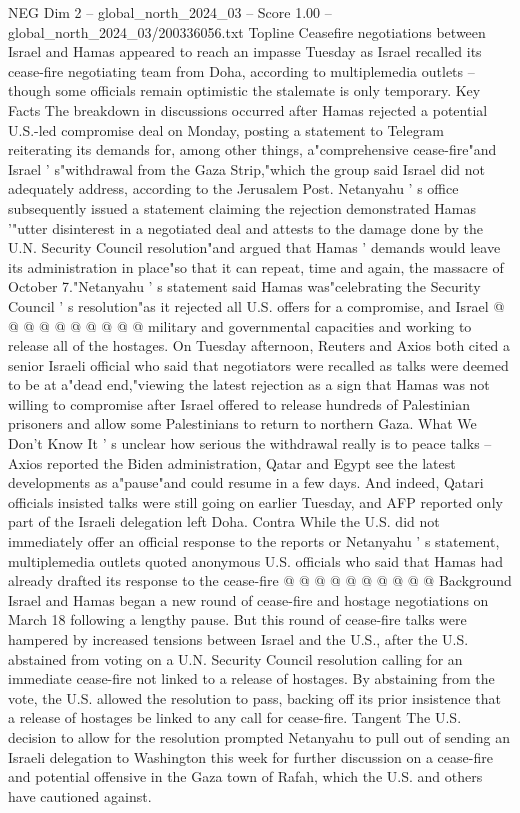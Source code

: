\begin{textsample}{NEG Dim 2 – global\_north\_2024\_03 – Score 1.00 – global\_north\_2024\_03/200336056.txt}  \label{ex:f2_neg_083}
Topline Ceasefire negotiations between Israel and Hamas appeared to reach an impasse Tuesday as Israel recalled its cease-fire negotiating team from Doha, according to multiplemedia outlets -- though some officials remain optimistic the stalemate is only temporary.
Key Facts The breakdown in discussions occurred after Hamas rejected a potential U.S.-led compromise deal on Monday, posting a statement to Telegram reiterating its demands for, among other things, a"comprehensive cease-fire"and Israel ' s"withdrawal from the Gaza Strip,"which the group said Israel did not adequately address, according to the Jerusalem Post.
Netanyahu ' s office subsequently issued a statement claiming the rejection demonstrated Hamas '"utter disinterest in a negotiated deal and attests to the damage done by the U.N.
Security Council resolution"and argued that Hamas ' demands would leave its administration in place"so that it can repeat, time and again, the massacre of October 7."Netanyahu ' s statement said Hamas was"celebrating the Security Council ' s resolution"as it rejected all U.S. offers for a compromise, and Israel @ @ @ @ @ @ @ @ @ @ military and governmental capacities and working to release all of the hostages.
On Tuesday afternoon, Reuters and Axios both cited a senior Israeli official who said that negotiators were recalled as talks were deemed to be at a"dead end,"viewing the latest rejection as a sign that Hamas was not willing to compromise after Israel offered to release hundreds of Palestinian prisoners and allow some Palestinians to return to northern Gaza.
What We Don't Know It ' s unclear how serious the withdrawal really is to peace talks -- Axios reported the Biden administration, Qatar and Egypt see the latest developments as a"pause"and could resume in a few days.
And indeed, Qatari officials insisted talks were still going on earlier Tuesday, and AFP reported only part of the Israeli delegation left Doha.
Contra While the U.S. did not immediately offer an official response to the reports or Netanyahu ' s statement, multiplemedia outlets quoted anonymous U.S. officials who said that Hamas had already drafted its response to the cease-fire @ @ @ @ @ @ @ @ @ @ Background Israel and Hamas began a new round of cease-fire and hostage negotiations on March 18 following a lengthy pause.
But this round of cease-fire talks were hampered by increased tensions between Israel and the U.S., after the U.S. abstained from voting on a U.N.
Security Council resolution calling for an immediate cease-fire not linked to a release of hostages.
By abstaining from the vote, the U.S. allowed the resolution to pass, backing off its prior insistence that a release of hostages be linked to any call for cease-fire.
Tangent The U.S. decision to allow for the resolution prompted Netanyahu to pull out of sending an Israeli delegation to Washington this week for further discussion on a cease-fire and potential offensive in the Gaza town of Rafah, which the U.S. and others have cautioned against.

\end{textsample}
